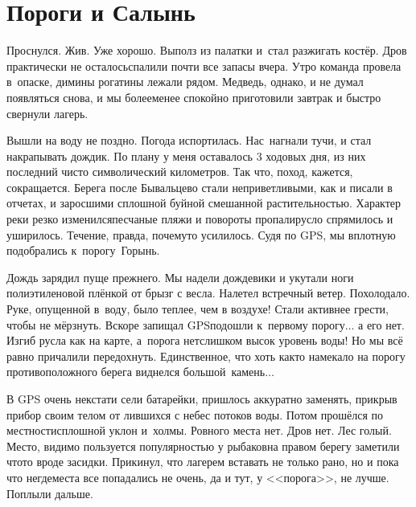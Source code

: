 \chapter{Пороги и Салынь} 
\vepsianrose

Проснулся. Жив. Уже хорошо. Выполз из палатки и~стал разжигать костёр. Дров практически не осталось\mdash спалили почти все запасы вчера. Утро команда провела в~опаске, димины рогатины лежали рядом. Медведь, однако, и не думал появляться снова, и мы более\sdash менее спокойно приготовили завтрак и быстро свернули лагерь. 

Вышли на воду не поздно. Погода испортилась. Нас~нагнали тучи, и стал накрапывать дождик. По плану у меня оставалось 3 ходовых дня, из них последний чисто символический километров. Так что, поход, кажется, сокращается. Берега после Бывальцево стали неприветливыми, как и писали в отчетах, и заросшими сплошной буйной смешанной растительностью. Характер реки резко изменился\mdash песчаные пляжи и повороты пропали\mdash русло спрямилось и уширилось. Течение, правда, почему\sdash то усилилось. Судя по GPS, мы вплотную подобрались к~порогу~Горынь.

Дождь зарядил пуще прежнего. Мы надели дождевики и укутали ноги полиэтиленовой плёнкой от брызг с весла. Налетел встречный ветер. Похолодало. Руке, опущенной в~воду, было теплее, чем в воздухе! Стали активнее грести, чтобы не мёрзнуть. Вскоре запищал GPS\mdash подошли к~первому порогу$\ldots$ а его нет. Изгиб русла как на карте, а~порога нет\mdash слишком высок уровень воды! Но мы всё равно причалили передохнуть. Единственное, что хоть как\sdash то намекало на порог\mdash у противоположного берега виднелся большой~камень$\ldots$ 

В GPS очень некстати сели батарейки, пришлось аккуратно заменять, прикрыв прибор своим телом от лившихся с небес потоков воды. Потом прошёлся по местности\mdash сплошной уклон и~холмы. Ровного места нет. Дров нет. Лес голый. Место, видимо пользуется популярностью у рыбаков\mdash на правом берегу заметили что\sdash то вроде засидки. Прикинул, что лагерем вставать не только рано, но и пока что негде\mdash места все попадались не очень, да и тут, у <<порога>>, не лучше. Поплыли дальше. 

